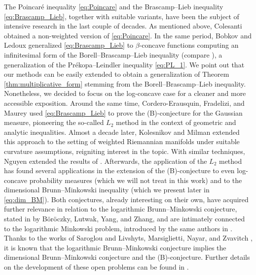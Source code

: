 \documentclass[a4paper, 11pt]{article}
\theoremstyle{definition}
\begin{document}
\medskip 

The Poincar\'e inequality \eqref{eq:Poincare} and the Brascamp--Lieb inequality \eqref{eq:Brascamp_Lieb}, together with suitable variants, have been the subject of intensive research in the last couple of decades. As mentioned above, Colesanti \cite{Colesanti_poincare} obtained a non-weighted version of \eqref{eq:Poincare}. In the same period, Bobkov and Ledoux \cite{Bobkvo_Ledoux, Bobkov_Ledoux_weight} generalized \eqref{eq:Brascamp_Lieb} to $\beta$-concave functions computing an infinitesimal form of the Borell--Brascamp--Lieb inequality (compare \cite{Borell, Brascamp_Lieb_76}), a generalization of the Pr\'ekopa--Leindler inequality \eqref{eq:PL_1}. We point out that our methods can be easily extended to obtain a generalization of Theorem \ref{thm:multiplicative_form} stemming from the Borell--Brascamp--Lieb inequality. Nonetheless, we decided to focus on the log-concave case for a cleaner and more accessible exposition. Around the same time, Cordero-Erausquin, Fradelizi, and Maurey \cite{Cordero-BGaussian} used \eqref{eq:Brascamp_Lieb} to prove the (B)-conjecture for the Gaussian measure, pioneering the so-called $L_2$ method in the context of geometric and analytic inequalities. Almost a decade later, Kolesnikov and Milman \cite{Kol_Mil_BL, Kol_Mil_P} extended this approach to the setting of weighted Riemannian manifolds under suitable curvature assumptions, reigniting interest in the topic. With similar techniques, Nguyen \cite{Nguyen_BL} extended the results of \cite{Bobkvo_Ledoux}. Afterwards, the application of the $L_2$ method has found several applications in the extension of the (B)-conjecture to even log-concave probability measures \cite{cordero2025concavity, B-conjecture, rot_B} (which we will not treat in this work) and to the dimensional Brunn--Minkowski inequality \cite{cordero2025concavity, rot_B, dim_gauss, ChadGalynaL_p,Kol_Liv_Gardner-Zvavitch, GalynaDimensional_BM} (which we present later in \eqref{eq:dim_BM}). Both conjectures, already interesting on their own, have acquired further relevance in relation to the logarithmic Brunn--Minkowski conjecture, stated in \cite{log_in} by B\"or\"oczky, Lutwak, Yang, and Zhang, and are intimately connected to the logarithmic Minkowski problem, introduced by the same authors in \cite{log_Mink}. Thanks to the works of Saroglou \cite{Sar} and Livshyts, Marsiglietti, Nayar, and Zvavitch \cite{misc}, it is known that the logarithmic Brunn--Minkowski conjecture implies the dimensional Brunn--Minkowski conjecture and the (B)-conjecture. Further details on the development of these open problems can be found in \cite{cordero2025concavity}.
\end{document}
